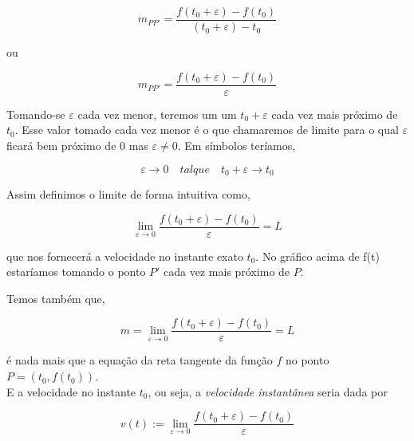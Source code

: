 \documentclass[a4paper, 12pt]{report}
\begin{document}
	
	$$m_{PP'} = \frac{f(t_0+\varepsilon) - f(t_0)}{(t_0 + \varepsilon) - t_0}$$
	
	
	ou
	
	\begin{equation}
	m_{PP'} = \frac{f(t_0+\varepsilon) - f(t_0)}{\varepsilon}	
	\end{equation}
	
	Tomando-se $\varepsilon$ cada vez menor, teremos um um $t_0 + \varepsilon$ cada vez mais próximo de $t_0$. Esse valor tomado cada vez menor é o que chamaremos de limite para o qual $\varepsilon$ ficará bem próximo de $0$ mas $\varepsilon \neq 0$. Em símbolos teríamos,

	$$\varepsilon \longrightarrow 0 \quad talque \quad t_0+\varepsilon \longrightarrow t_0$$
	
	Assim definimos o limite de forma intuitiva como,
	
	\begin{equation}
		\lim_{\varepsilon \rightarrow 0} \frac{f(t_0+\varepsilon) - f(t_0)}{\varepsilon} = L
	\end{equation}
	
	que nos fornecerá a velocidade no instante exato $t_0$. No gráfico acima de f(t) estaríamos tomando o ponto $P'$ cada vez mais próximo de $P$.
	
	Temos também que,
	
	$$ m = \lim_{\varepsilon \rightarrow 0} \frac{f(t_0+\varepsilon) - f(t_0)}{\varepsilon} = L$$
	
	é nada mais que a equação da reta tangente da função $f$ no ponto $ P = (t_0, f(t_0))$.
	\\
	
	E a velocidade no instante $t_0$, ou seja, a \textit{velocidade instantânea} seria dada por
	
	\begin{equation}
	v(t) := \lim_{\varepsilon \rightarrow 0} \frac{f(t_0+\varepsilon) - f(t_0)}{\varepsilon} 
	\end{equation}
\end{document}
